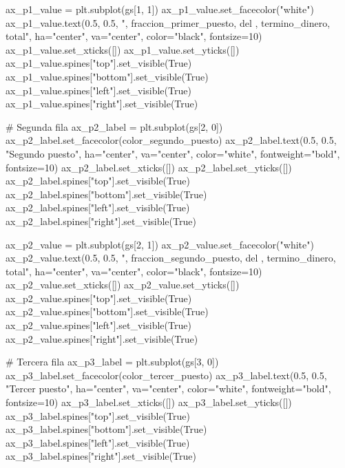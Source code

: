 \documentclass[
]{article}
\newenvironment{Shaded}{\begin{snugshade}}{\end{snugshade}}
\newcommand{\NormalTok}[1]{#1}
\newcommand{\StringTok}[1]{\textcolor[rgb]{0.31,0.60,0.02}{#1}}
\begin{document}
\begin{Shaded}
\begin{Highlighting}[]
\StringTok{ax\_p1\_value = plt.subplot(gs[1, 1])}
\StringTok{ax\_p1\_value.set\_facecolor("white")}
\StringTok{ax\_p1\_value.text(0.5, 0.5, "\textquotesingle{}}\NormalTok{, fraccion\_primer\_puesto, }\StringTok{\textquotesingle{} del \textquotesingle{}}\NormalTok{, termino\_dinero, }\StringTok{\textquotesingle{} total",}
\StringTok{                ha="center", va="center", color="black", fontsize=10)}
\StringTok{ax\_p1\_value.set\_xticks([])}
\StringTok{ax\_p1\_value.set\_yticks([])}
\StringTok{ax\_p1\_value.spines["top"].set\_visible(True)}
\StringTok{ax\_p1\_value.spines["bottom"].set\_visible(True)}
\StringTok{ax\_p1\_value.spines["left"].set\_visible(True)}
\StringTok{ax\_p1\_value.spines["right"].set\_visible(True)}

\StringTok{\# Segunda fila}
\StringTok{ax\_p2\_label = plt.subplot(gs[2, 0])}
\StringTok{ax\_p2\_label.set\_facecolor(color\_segundo\_puesto)}
\StringTok{ax\_p2\_label.text(0.5, 0.5, "Segundo puesto", ha="center", va="center", color="white", fontweight="bold", fontsize=10)}
\StringTok{ax\_p2\_label.set\_xticks([])}
\StringTok{ax\_p2\_label.set\_yticks([])}
\StringTok{ax\_p2\_label.spines["top"].set\_visible(True)}
\StringTok{ax\_p2\_label.spines["bottom"].set\_visible(True)}
\StringTok{ax\_p2\_label.spines["left"].set\_visible(True)}
\StringTok{ax\_p2\_label.spines["right"].set\_visible(True)}

\StringTok{ax\_p2\_value = plt.subplot(gs[2, 1])}
\StringTok{ax\_p2\_value.set\_facecolor("white")}
\StringTok{ax\_p2\_value.text(0.5, 0.5, "\textquotesingle{}}\NormalTok{, fraccion\_segundo\_puesto, }\StringTok{\textquotesingle{} del \textquotesingle{}}\NormalTok{, termino\_dinero, }\StringTok{\textquotesingle{} total",}
\StringTok{                ha="center", va="center", color="black", fontsize=10)}
\StringTok{ax\_p2\_value.set\_xticks([])}
\StringTok{ax\_p2\_value.set\_yticks([])}
\StringTok{ax\_p2\_value.spines["top"].set\_visible(True)}
\StringTok{ax\_p2\_value.spines["bottom"].set\_visible(True)}
\StringTok{ax\_p2\_value.spines["left"].set\_visible(True)}
\StringTok{ax\_p2\_value.spines["right"].set\_visible(True)}

\StringTok{\# Tercera fila}
\StringTok{ax\_p3\_label = plt.subplot(gs[3, 0])}
\StringTok{ax\_p3\_label.set\_facecolor(color\_tercer\_puesto)}
\StringTok{ax\_p3\_label.text(0.5, 0.5, "Tercer puesto", ha="center", va="center", color="white", fontweight="bold", fontsize=10)}
\StringTok{ax\_p3\_label.set\_xticks([])}
\StringTok{ax\_p3\_label.set\_yticks([])}
\StringTok{ax\_p3\_label.spines["top"].set\_visible(True)}
\StringTok{ax\_p3\_label.spines["bottom"].set\_visible(True)}
\StringTok{ax\_p3\_label.spines["left"].set\_visible(True)}
\StringTok{ax\_p3\_label.spines["right"].set\_visible(True)}


\end{Highlighting}
\end{Shaded}
\end{document}
